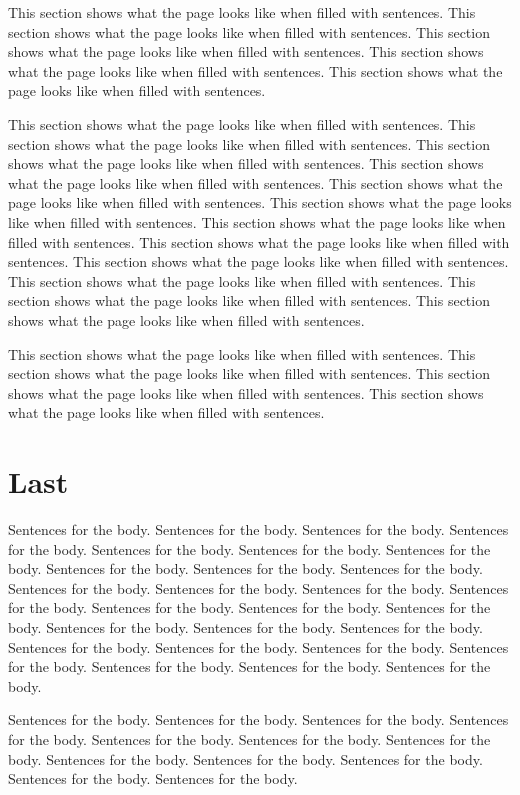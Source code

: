 This section shows what the page looks like when filled with sentences.
This section shows what the page looks like when filled with sentences.
This section shows what the page looks like when filled with sentences.
This section shows what the page looks like when filled with sentences.
This section shows what the page looks like when filled with sentences.

This section shows what the page looks like when filled with sentences.
This section shows what the page looks like when filled with sentences.
This section shows what the page looks like when filled with sentences.
This section shows what the page looks like when filled with sentences.
This section shows what the page looks like when filled with sentences.
This section shows what the page looks like when filled with sentences.
This section shows what the page looks like when filled with sentences.
This section shows what the page looks like when filled with sentences.
This section shows what the page looks like when filled with sentences.
This section shows what the page looks like when filled with sentences.
This section shows what the page looks like when filled with sentences.
This section shows what the page looks like when filled with sentences.

This section shows what the page looks like when filled with sentences.
This section shows what the page looks like when filled with sentences.
This section shows what the page looks like when filled with sentences.
This section shows what the page looks like when filled with sentences.

\section{Last}

Sentences for the body.  Sentences for the body.  Sentences for the body.
Sentences for the body.  Sentences for the body.  Sentences for the body.
Sentences for the body.  Sentences for the body.  Sentences for the body.
Sentences for the body.  Sentences for the body.  Sentences for the body.
Sentences for the body.  Sentences for the body.  Sentences for the body.
Sentences for the body.  Sentences for the body.  Sentences for the body.
Sentences for the body.  Sentences for the body.  Sentences for the body.
Sentences for the body.  Sentences for the body.  Sentences for the body.
Sentences for the body.  Sentences for the body.  Sentences for the body.

Sentences for the body.  Sentences for the body.  Sentences for the body.
Sentences for the body.  Sentences for the body.  Sentences for the body.
Sentences for the body.  Sentences for the body.  Sentences for the body.
Sentences for the body.  Sentences for the body.  Sentences for the body.

